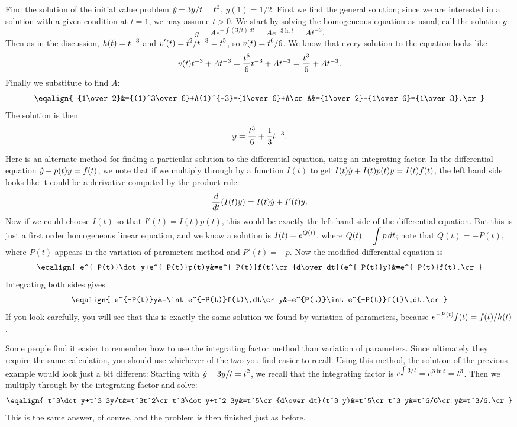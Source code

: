 \example Find the solution of the initial value problem
$\displaystyle \dot y+3y/t=t^2$, $y(1)=1/2$. First we find the general solution;
since we are interested in a solution with a given condition at $t=1$,
we may assume $t>0$.
We start by solving the homogeneous equation as usual; call the
solution $g$:
$$g=Ae^{-\int (3/t)\,dt}=Ae^{-3\ln t}=At^{-3}.$$
Then as in the discussion, $\displaystyle h(t)=t^{-3}$ and
$\displaystyle v'(t)=t^2/t^{-3}=t^5$, so $\displaystyle v(t)=t^6/6$. We know that
every solution to the equation looks like
$$v(t)t^{-3}+At^{-3}={t^6\over6}t^{-3}+At^{-3}={t^3\over6}+At^{-3}.$$
Finally we substitute to find $A$:
$$\eqalign{
{1\over 2}&={(1)^3\over6}+A(1)^{-3}={1\over6}+A\cr
A&={1\over 2}-{1\over6}={1\over3}.\cr}
$$
The solution is then
$$y={t^3\over6}+{1\over3}t^{-3}.$$
\endexample

Here is an alternate method for finding a particular solution to the
differential equation, using an
{\dfont integrating factor\/}. In the differential equation $\displaystyle \dot
y+p(t)y=f(t)$, we note that if we multiply through by a function
$I(t)$ to get $\displaystyle I(t)\dot y+I(t)p(t)y=I(t)f(t)$, the left hand side
looks like it could be a derivative computed by the product rule:
$${d\over dt}(I(t)y)=I(t)\dot y+I'(t)y.$$
Now if we could choose $I(t)$ so that $I'(t)=I(t)p(t)$, this would be
exactly the left hand side of the differential equation. But this is
just a first order homogeneous linear equation, and we know a solution
is $\displaystyle I(t)=e^{Q(t)}$, where $\displaystyle Q(t)=\int p\,dt$; note that 
$Q(t)=-P(t)$, where $P(t)$ appears in the variation of parameters
method and $P'(t)=-p$. Now the modified differential equation is 
$$
\eqalign{
e^{-P(t)}\dot y+e^{-P(t)}p(t)y&=e^{-P(t)}f(t)\cr
{d\over dt}(e^{-P(t)}y)&=e^{-P(t)}f(t).\cr
}$$
Integrating both sides gives
$$
\eqalign{
e^{-P(t)}y&=\int e^{-P(t)}f(t)\,dt\cr
y&=e^{P(t)}\int e^{-P(t)}f(t)\,dt.\cr
}$$
If you look carefully, you will see that this is exactly the same
solution we found by variation of parameters, because
$\displaystyle e^{-P(t)}f(t)=f(t)/h(t)$.

Some people find it easier to remember how to use the integrating
factor method than variation of parameters. Since ultimately they
require the same calculation, you should use whichever of the two you
find easier to recall. Using this method, the solution of the previous
example would look just a bit different: Starting with
$\displaystyle \dot y+3y/t=t^2$, we recall that the integrating factor is
$\displaystyle e^{\int 3/t}=e^{3\ln t}=t^3$. Then we multiply through by the
integrating factor and solve:
$$\eqalign{
t^3\dot y+t^3 3y/t&=t^3t^2\cr
t^3\dot y+t^2 3y&=t^5\cr
{d\over dt}(t^3 y)&=t^5\cr
t^3 y&=t^6/6\cr
y&=t^3/6.\cr}
$$
This is the same answer, of course, and the problem is then finished
just as before.

